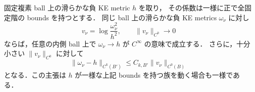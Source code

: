 \begin{lemma}
\label{coarse:lem:small-volume-tensor}
固定複素 ball 上の滑らかな負 KE metric $h$ を取り，
その係数は一様に正で全固定階の bounds を持つとする．
同じ ball 上の滑らかな負 KE metrics $\omega_\nu$ に対し
\[
 v_\nu=\log\frac{\omega_\nu^2}{h^2},\qquad
 \|v_\nu\|_{C^0}\longrightarrow0
\]
ならば，任意の内側 ball 上で
$\omega_\nu\to h$ が $C^\infty$ の意味で成立する．
さらに，十分小さい $\|v_\nu\|_{C^0}$ に対して
\begin{equation}\label{moving:eq:linear-smallness}
 \|\omega_\nu-h\|_{C^k(B')}
 \le C_{k,B'}\|v_\nu\|_{C^0(B)}
\end{equation}
となる．この主張は $h$ が一様な上記 bounds を持つ族を動く場合も一様である．
\end{lemma}

